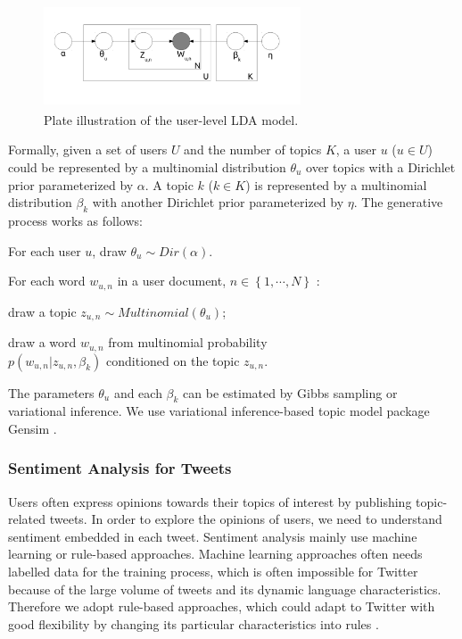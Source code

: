 \documentclass{acm_proc_article-sp}
\begin{document}
\begin{figure}[htb]
\centering
\includegraphics[width=3.0in,height=1.2in]{LDA.pdf}
\caption{Plate illustration of the user-level LDA model.}
\label{fig:graph2}
\end{figure}

Formally, given a set of users $ U $ and the number of topics $ K $, a user $u$ ($ u \in U $) could be represented by a multinomial distribution $ \theta_{u} $ over topics with a Dirichlet prior parameterized by $ \alpha $. 
A topic $ k $ ($ k \in K $) is represented by a multinomial distribution $ \beta_{k} $ with another Dirichlet prior parameterized by $ \eta $. 
The generative process works as follows:
\begin{itemize*}
\item For each user $ u $, draw $ \theta_{u} \sim Dir \left(  \alpha \right) $.
\item For each word $ w_{u,n} $ in a user document, $ n \in \left\lbrace 1, \cdots, N \right\rbrace $ :
\begin{itemize*}
\item draw a topic $ z_{u,n} \sim Multinomial \left( \theta_{u}  \right) $;
\item draw a word $ w_{u,n} $ from multinomial probability\\ $  p \left( w_{u,n} \vert z_{u,n}, \beta_{k}  \right) $ conditioned on the topic $ z_{u,n} $.
\end{itemize*}
\end{itemize*}
The parameters $ \theta_{u} $ and each $ \beta_{k} $ can be estimated by Gibbs sampling or variational inference.
We use variational inference-based topic model package Gensim \cite{rehurek_lrec}.

\subsubsection{Sentiment Analysis for Tweets}
\label{sentiment}
Users often express opinions towards their topics of interest by publishing topic-related tweets. 
In order to explore the opinions of users, we need to understand sentiment embedded in each tweet.
Sentiment analysis mainly use machine learning or rule-based approaches. 
Machine learning approaches often needs labelled data for the training process, which is often impossible for Twitter because of the large volume of tweets and its dynamic language characteristics. Therefore we adopt rule-based approaches, which could adapt to Twitter with good flexibility by changing its particular characteristics into rules \cite{Thelwall:2010SSS,Hu:2013www}.
\end{document}
